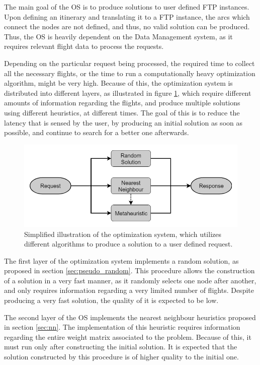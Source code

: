 The main goal of the \ac{OS} is to produce solutions to user defined FTP instances. Upon defining an itinerary and translating it to a FTP instance, the arcs which connect the nodes are not defined, and thus, no valid solution can be produced. Thus, the OS is heavily dependent on the Data Management system, as it requires relevant flight data to process the requests. 

Depending on the particular request being processed, the required time to collect all the necessary flights, or the time to run a computationally heavy optimization algorithm, might be very high. Because of this, the optimization system is distributed into different layers, as illustrated in figure \ref{fig:optimization_system}, which require different amounts of information regarding the flights, and produce multiple solutions using different heuristics, at different times. The goal of this is to reduce the latency that is sensed by the user, by producing an initial solution as soon as possible, and continue to search for a better one afterwards.

\begin{figure}[htpb]
  \centering
  \includegraphics[width=\textwidth]{./Figures/system_design/utility.png}
  \caption{Simplified illustration of the optimization system, which utilizes different algorithms 
  to produce a solution to a user defined request.}
  \label{fig:optimization_system}  
\end{figure}

The first layer of the optimization system implements a random solution, as proposed in section \ref{sec:pseudo_random}. This procedure allows the construction of a solution in a very fast manner, as it randomly selects one node after another, and only requires information regarding a very limited number of flights. Despite producing a very fast solution, the quality of it is expected to be low.

The second layer of the OS implements the nearest neighbour heuristics proposed in section \ref{sec:nn}. The implementation of this heuristic requires information regarding the entire weight matrix associated to the problem. Because of this, it must run only after constructing the initial solution. It is expected that the solution constructed by this procedure is of higher quality to the initial one.

